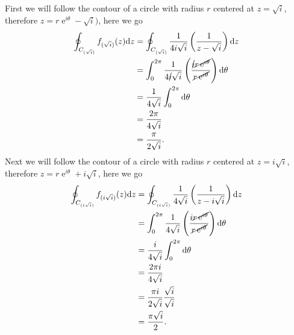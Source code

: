\documentclass[10pt]{amsart}
\newcommand{\D}{\mathrm{d}}
\DeclareMathOperator{\E}{e}
\theoremstyle{nonumberplain}
\begin{document}
\begin{enumerate}[label={\bf {\arabic*}:}]
First we will follow the contour of a circle with radius $r$ centered at $z = \sqrt{i}$, therefore $z = r\E^{i\theta} - \sqrt{i})$, here we go
\begin{align*}
\oint_{C_{(\sqrt{i})}} f_{(\sqrt{i})}(z) \D z
	&= \oint_{C_{(\sqrt{i})}} \frac{1}{4i\sqrt{i}} \left( \frac{1}{z - \sqrt{i}} \right) \D z \\
	&= \int_0^{2\pi} \frac{1}{4\cancel{i}\sqrt{i}}\left(\frac{\cancel{i}\cancel{r\E^{i\theta}}}{\cancel{r\E^{i\theta}}} \right) \D \theta \\
	&= \frac{1}{4\sqrt{i}} \int_0^{2\pi} \D \theta \\
	&= \frac{2 \pi}{4\sqrt{i}} \\
	&= \frac{\pi}{2\sqrt{i}}. \\
\end{align*}
Next we will follow the contour of a circle with radius $r$ centered at $z = i\sqrt{i}$, therefore $z = r\E^{i\theta} + i\sqrt{i}$, here we go
\begin{align*}
\oint_{C_{(i\sqrt{i})}} f_{(i\sqrt{i})}(z) \D z &= \oint_{C_{(i\sqrt{i})}} \frac{1}{4\sqrt{i}} \left(\frac{1}{z - i\sqrt{i}} \right) \D z \\
	&= \int_0^{2\pi} \frac{1}{4\sqrt{i}}\left(\frac{i\cancel{r\E^{i\theta}}}{\cancel{r\E^{i\theta}}} \right) \D \theta \\
	&= \frac{i}{4\sqrt{i}} \int_0^{2\pi}  \D \theta \\
	&= \frac{2\pi i}{4\sqrt{i}} \\
	&= \frac{\pi i}{2\sqrt{i}} \frac {\sqrt{i}} {\sqrt{i}} \\
	&= \frac{\pi \sqrt{i}}{2}. \\
\end{align*}


\end{enumerate}
\end{document}
